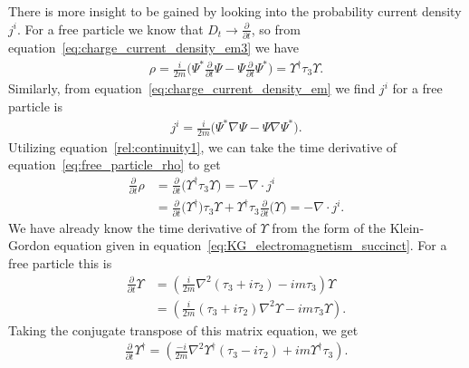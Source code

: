\documentclass[titlepage,letterpaper,onecolumn,11pt,final]{report}
\numberwithin{equation}{section}
\numberwithin{figure}{section}
\begin{document}
There is more insight to be gained by looking into the probability current density $j^{i}$. For a free particle we know that $D_{t} \rightarrow \frac{\partial}{\partial t}$, so from equation~\ref{eq:charge_current_density_em3} we have
\begin{gather}
	\label{eq:free_particle_rho}
	\rho = \frac{i}{2 m} \bigg( \Psi^{*} \frac{\partial}{\partial t} \Psi - \Psi \frac{\partial}{\partial t} \Psi^{*} \bigg) = \Upsilon^{\dagger} \tau_{3} \Upsilon .
\end{gather}
%
Similarly, from equation~\ref{eq:charge_current_density_em} we find $j^{i}$ for a free particle is
\begin{gather}
	\label{eq:free_particle_j}
	j^{i} = \frac{i}{2 m} \bigg( \Psi^{*} \nabla \Psi - \Psi \nabla \Psi^{*} \bigg).
\end{gather}
%
Utilizing equation~\ref{rel:continuity1}, we can take the time derivative of equation~\ref{eq:free_particle_rho} to get
\begin{equation}
	\begin{split}
	\label{eq:rho_t_derivative}
	\frac{\partial}{\partial t} \rho &= \frac{\partial}{\partial t} \bigg( \Upsilon^{\dagger} \tau_{3} \Upsilon \bigg) = - \nabla \cdot j^{i} \\
	&= \frac{\partial}{\partial t} \bigg( \Upsilon^{\dagger} \bigg) \tau_{3} \Upsilon + \Upsilon^{\dagger} \tau_{3} \frac{\partial}{\partial t} \bigg( \Upsilon \bigg)  = - \nabla \cdot j^{i} .
	\end{split}
\end{equation}
%
We have already know the time derivative of $\Upsilon$ from the form of the Klein-Gordon equation given in equation~\ref{eq:KG_electromagnetism_succinct}. For a free particle this is
\begin{equation}
	\begin{split}
	\label{eq:derivative_upsilon}
	\frac{\partial}{\partial t} \Upsilon &= \left( \frac{i}{2 m} \nabla^{2} (\tau_{3} + i \tau_{2}) - i m \tau_{3} \right) \Upsilon \\
	&= \left( \frac{i}{2 m} (\tau_{3} + i \tau_{2}) \nabla^{2} \Upsilon - i m \tau_{3} \Upsilon \right).
	\end{split}
\end{equation}
%
Taking the conjugate transpose of this matrix equation, we get
\begin{gather}
	\label{eq:derivative_upsilon_dagger}
	\frac{\partial}{\partial t} \Upsilon^{\dagger} = \left( \frac{-i}{2 m} \nabla^{2} \Upsilon^{\dagger} (\tau_{3} - i \tau_{2}) + i m \Upsilon^{\dagger} \tau_{3} \right).
\end{gather}
\end{document}
